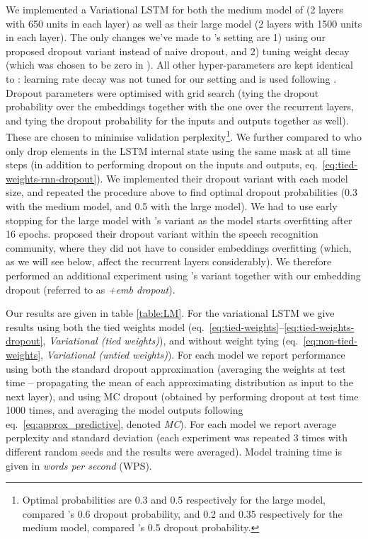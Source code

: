 \documentclass{article}
\theoremstyle{definition}
\begin{document}
We implemented a Variational LSTM for both the medium model of \citep{zaremba2014recurrent}  (2 layers with 650 units in each layer) as well as their large model (2 layers with 1500 units in each layer). 
The only changes we've made to \citep{zaremba2014recurrent}'s setting are
1) using our proposed dropout variant instead of naive dropout, and
2) tuning weight decay (which was chosen to be zero in \citep{zaremba2014recurrent}).
All other hyper-parameters are kept identical to \citep{zaremba2014recurrent}: learning rate decay was not tuned for our setting and is used following \citep{zaremba2014recurrent}. 
Dropout parameters were optimised with grid search
(tying the dropout probability over the embeddings together with the one over the recurrent layers, and tying the dropout probability for the inputs and outputs together as well). These are chosen to minimise validation perplexity\footnote{Optimal probabilities are 0.3 and 0.5 respectively for the large model, compared \citep{zaremba2014recurrent}'s 0.6 dropout probability, and 0.2 and 0.35 respectively for the medium model, compared \citep{zaremba2014recurrent}'s 0.5 dropout probability.}.
We further compared to \citet{moon2015rnndrop} who only drop elements in the LSTM internal state using the same mask at all time steps (in addition to performing dropout on the inputs and outputs, eq.\ \eqref{eq:tied-weights-rnn-dropout}). 
We implemented their dropout variant with each model size, and repeated the procedure above to find optimal dropout probabilities 
(0.3 with the medium model, and 0.5  with the large model). We had to use early stopping for the large model with \citep{moon2015rnndrop}'s variant as the model starts overfitting after 16 epochs. 
\citet{moon2015rnndrop} proposed their dropout variant within the speech recognition community, where they did not have to consider embeddings overfitting (which, as we will see below, affect the recurrent layers considerably). We therefore performed an additional experiment using \citep{moon2015rnndrop}'s variant together with our embedding dropout (referred to as \textit{\citet{moon2015rnndrop}+emb dropout}).


Our results are given in table \ref{table:LM}. 
For the variational LSTM we give results using both the tied weights model (eq.\ \eqref{eq:tied-weights}--\eqref{eq:tied-weights-dropout}, \textit{Variational (tied weights)}), and without weight tying (eq.\ \eqref{eq:non-tied-weights}, \textit{Variational (untied weights)}). For each model we report performance using both the standard dropout approximation (averaging the weights at test time -- propagating the mean of each approximating distribution as input to the next layer), and using MC dropout (obtained by performing dropout at test time 1000 times, and averaging the model outputs following eq.\ \eqref{eq:approx_predictive}, denoted \textit{MC}).
For each model we report average perplexity and standard deviation (each experiment was repeated 3 times with different random seeds and the results were averaged).
Model training time is given in \textit{words per second} (WPS).
\end{document}
